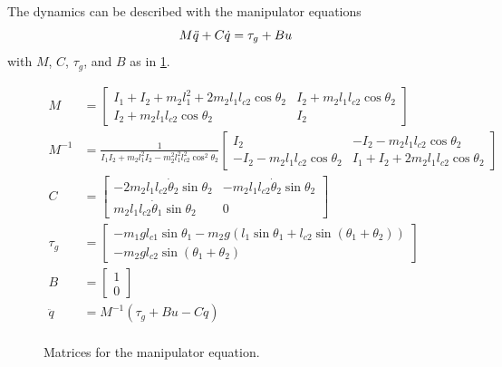 \documentclass[conference]{IEEEtran}
\begin{document}
The dynamics can be described with the manipulator equations
\begin{equation}
	M\ddot q+C\dot q = \tau_g+Bu \\
\end{equation}
with $M$, $C$, $\tau_g$, and $B$ as in \cref{fig:matrices}.
\begin{figure}
	\begin{align}
		M &= \begin{bmatrix}
			I_1+I_2+m_2l_1^2+2m_2l_1l_{c2}\cos\theta_2 & I_2+m_2l_1l_{c2}\cos\theta_2 \\
			I_2+m_2l_1l_{c2}\cos\theta_2 & I_2
		\end{bmatrix} \\
		M^{-1} &= \frac1{I_1I_2+m_2l_1^2I_2-m_2^2l_1^2l_{c2}^2\cos^2\theta_2} \begin{bmatrix}
			I_2 & -I_2-m_2l_1l_{c2}\cos\theta_2 \\
			-I_2-m_2l_1l_{c2}\cos\theta_2 & I_1+I_2+2m_2l_1l_{c2}\cos\theta_2
		\end{bmatrix} \\
		C &= \begin{bmatrix}
			-2m_2l_1l_{c2}\dot\theta_2\sin\theta_2 & -m_2l_1l_{c2}\dot\theta_2\sin\theta_2 \\
			m_2l_1l_{c2}\dot\theta_1\sin\theta_2 & 0
		\end{bmatrix} \\
		\tau_g &= \begin{bmatrix}
			-m_1gl_{c1}\sin\theta_1-m_2g(l_1\sin\theta_1+l_{c2}\sin(\theta_1+\theta_2)) \\
			-m_2gl_{c2}\sin(\theta_1+\theta_2)
		\end{bmatrix} \\
		B &= \begin{bmatrix}
			1 \\ 0
		\end{bmatrix} \\
		\ddot q &= M^{-1}(\tau_g + Bu - C\dot q) \\
	\end{align}
	\caption{Matrices for the manipulator equation.}
	\label{fig:matrices}
\end{figure}
\end{document}
